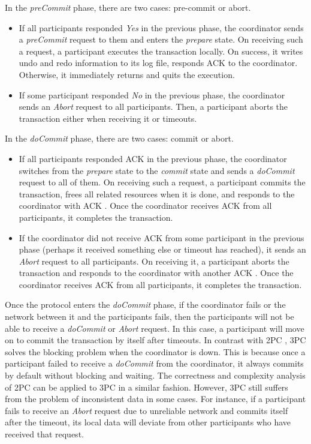 \documentclass[11pt]{article}
\begin{document}
    In the \textit{preCommit} phase, there are two cases: pre-commit or abort.
    \begin{itemize}
      \item If all participants responded \textit{Yes} in the previous phase, the coordinator sends a \textit{preCommit} request to them and enters the \textit{prepare} state. On receiving such a request, a participant executes the transaction locally. On success, it writes undo and redo information to its log file, responds \small{ACK} \normalsize to the coordinator. Otherwise, it immediately returns and quits the execution.
      \item If some participant responded \textit{No} in the previous phase, the coordinator sends an \textit{Abort} request to all participants. Then, a participant aborts the transaction either when receiving it or timeouts.
    \end{itemize}

    In the \textit{doCommit} phase, there are two cases: commit or abort.
    \begin{itemize}
      \item If all participants responded \small{ACK} \normalsize in the previous phase, the coordinator switches from the \textit{prepare} state to the \textit{commit} state and sends a \textit{doCommit} request to all of them. On receiving such a request, a participant commits the transaction, frees all related resources when it is done, and responds to the coordinator with \small{ACK} \normalsize. Once the coordinator receives \small{ACK} \normalsize from all participants, it completes the transaction.
      \item If the coordinator did not receive \small{ACK} \normalsize from some participant in the previous phase (perhaps it received something else or timeout has reached), it sends an \textit{Abort} request to all participants. On receiving it, a participant aborts the transaction and responds to the coordinator with another \small{ACK} \normalsize. Once the coordinator receives \small{ACK} \normalsize from all participants, it completes the transaction.
    \end{itemize}

    Once the protocol enters the \textit{doCommit} phase, if the coordinator fails or the network between it and the participants fails, then the participants will not be able to receive a \textit{doCommit} or \textit{Abort} request. In this case, a participant will move on to commit the transaction by itself after timeouts. In contrast with \small{2PC} \normalsize, \small{3PC} \normalsize solves the blocking problem when the coordinator is down. This is because once a participant failed to receive a \textit{doCommit} from the coordinator, it always commits by default without blocking and waiting. The correctness and complexity analysis of \small{2PC} \normalsize can be applied to \small{3PC} \normalsize in a similar fashion. However, \small{3PC} \normalsize still suffers from the problem of inconsistent data in some cases. For instance, if a participant fails to receive an \textit{Abort} request due to unreliable network and commits itself after the timeout, its local data will deviate from other participants who have received that request.
\end{document}
